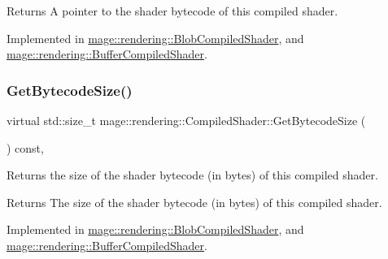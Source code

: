 \begin{DoxyReturn}{Returns}
A pointer to the shader bytecode of this compiled shader. 
\end{DoxyReturn}


Implemented in \mbox{\hyperlink{classmage_1_1rendering_1_1_blob_compiled_shader_a135655e22d372d55c2a3b6ea3e761852}{mage\+::rendering\+::\+Blob\+Compiled\+Shader}}, and \mbox{\hyperlink{classmage_1_1rendering_1_1_buffer_compiled_shader_aa19ad53b2761c07689476c3d77369b61}{mage\+::rendering\+::\+Buffer\+Compiled\+Shader}}.

\mbox{\label{classmage_1_1rendering_1_1_compiled_shader_a8e574ddc7247689426cc15c6c6d416f8}} 
\subsubsection{\texorpdfstring{Get\+Bytecode\+Size()}{GetBytecodeSize()}}
{\footnotesize\ttfamily virtual std\+::size\+\_\+t mage\+::rendering\+::\+Compiled\+Shader\+::\+Get\+Bytecode\+Size (\begin{DoxyParamCaption}{ }\end{DoxyParamCaption}) const\hspace{0.3cm}{\ttfamily [pure virtual]}, {\ttfamily [noexcept]}}

Returns the size of the shader bytecode (in bytes) of this compiled shader.

\begin{DoxyReturn}{Returns}
The size of the shader bytecode (in bytes) of this compiled shader. 
\end{DoxyReturn}


Implemented in \mbox{\hyperlink{classmage_1_1rendering_1_1_blob_compiled_shader_a259291746904bba3ab8bc096329d641e}{mage\+::rendering\+::\+Blob\+Compiled\+Shader}}, and \mbox{\hyperlink{classmage_1_1rendering_1_1_buffer_compiled_shader_a8c7815186d97444a5bcd009307ed8b9d}{mage\+::rendering\+::\+Buffer\+Compiled\+Shader}}.

\mbox{\label{classmage_1_1rendering_1_1_compiled_shader_a1981d885693b7849078f509f15b81071}} 
